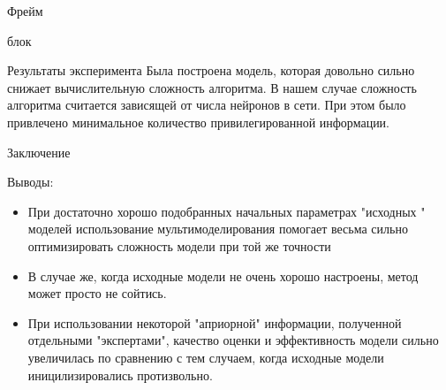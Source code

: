 \documentclass{beamer}
\begin{document}
\begin{frame}{Фрейм}
\begin{block}{блок}
\end{block}
\end{frame}

\begin{frame}{Результаты эксперимента}
Была построена модель, которая довольно сильно снижает вычислительную сложность алгоритма. В нашем случае сложность алгоритма считается зависящей от числа нейронов в сети. При этом было привлечено минимальное количество привилегированной информации. 
\end{frame}


\begin{frame}{Заключение}
\begin{block}{Выводы:}
\begin{itemize}
  \item При достаточно хорошо подобранных начальных параметрах "исходных " моделей использование мультимоделирования помогает весьма сильно оптимизировать сложность модели при той же точности

  \item В случае же, когда исходные модели не очень хорошо настроены, метод может просто не сойтись.

\item При использовании некоторой "априорной"  информации, полученной отдельными "экспертами",  качество оценки и эффективность модели сильно увеличилась по сравнению с тем случаем, когда исходные модели иницилизировались протизвольно.

\end{itemize}
\end{block}
\end{frame}
\end{document}
